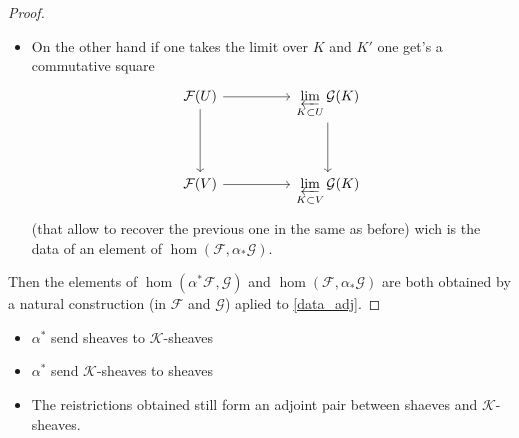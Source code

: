 \begin{proof}
\begin{itemize}
    \item On the other hand if one takes the limit over $K$ and $K'$ one get's a commutative square 
$$\begin{tikzcd}
	{\mathcal{F}(U)} && {\varprojlim\limits_{K\subset U}\mathcal{G}(K)} \\
	\\
	{\mathcal{F}(V)} && {\varprojlim\limits_{K\subset V}\mathcal{G}(K)}
	\arrow[from=1-1, to=1-3]
	\arrow[from=1-1, to=3-1]
	\arrow[from=1-3, to=3-3]
	\arrow[from=3-1, to=3-3]
\end{tikzcd}$$ (that allow to recover the previous one in the same as before) wich is the data of an element of $\hom(\mathcal{F},\alpha_*\mathcal{G})$.
\end{itemize}
    Then the elements of $\hom(\alpha^*\mathcal{F},\mathcal{G})$ and $\hom(\mathcal{F},\alpha_*\mathcal{G})$ are both obtained by a natural construction (in $\mathcal{F}$ and $\mathcal{G}$) aplied to \eqref{data_adj}.
\end{proof}

\begin{lemma}\label{lem:adj_kshv_and_shv}
    \begin{itemize}
        \item $\alpha^*$ send sheaves to $\mathcal{K}$-sheaves
        \item $\alpha^*$ send $\mathcal{K}$-sheaves to sheaves
        \item The reistrictions obtained still form an adjoint pair between shaeves and $\mathcal{K}$-sheaves.
    \end{itemize}
\end{lemma}


